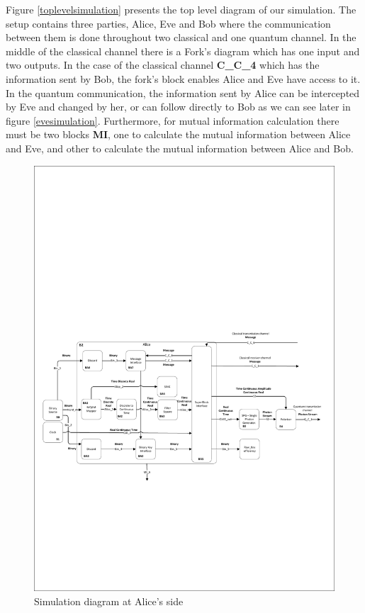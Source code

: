 \begin{enumerate}
Figure \ref{toplevelsimulation} presents the top level diagram of our simulation. The setup contains three parties, Alice, Eve and Bob where the communication between them is done throughout two classical and one quantum channel. In the middle of the classical channel there is a Fork's diagram which has one input and two outputs. In the case of the classical channel \textbf{C\_C\_4} which has the information sent by Bob, the fork's block enables Alice and Eve have access to it. In the quantum communication, the information sent by Alice can be intercepted by Eve and changed by her, or can follow directly to Bob as we can see later in figure \ref{evesimulation}. Furthermore, for mutual information calculation there must be two blocks \textbf{MI}, one to calculate the mutual information between Alice and Eve, and other to calculate the mutual information between Alice and Bob.

\begin{figure}[h]
    \centering
        \includegraphics[clip, trim=0.5cm 7cm 0.5cm 10cm, width=1.00\textwidth]{./sdf/bb84_with_discrete_variables/figures_raw/Simulation_Alice_bb84.pdf}
    \caption{Simulation diagram at Alice's side}\label{alicesimulation}
\end{figure}


\end{enumerate}
